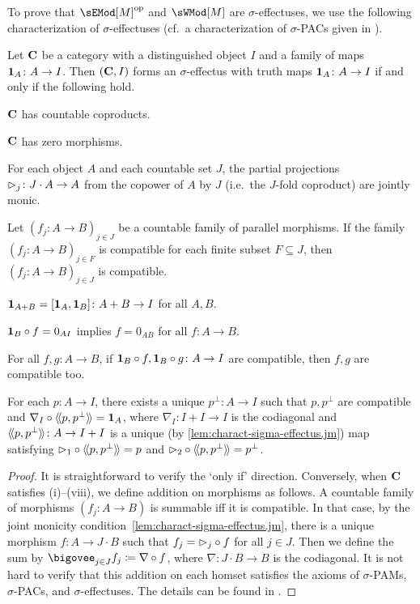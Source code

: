 \documentclass[%
	submission,
copyright,creativecommons,UKenglish]{eptcs}
\begin{document}
To prove that $\sEMod[M]^{\opp}$
and $\sWMod[M]$ are $\sigma$-effectuses,
we use the following characterization of $\sigma$-effectuses
(cf.\ a characterization of $\sigma$-PACs given in \cite[\S\,5]{ArbibM1980}).

\begin{lemma}
\label{lem:charact-sigma-effectus}
Let $\mathbf{C}$ be a category with
a distinguished object $I$ and
a family of maps $\mathbf{1}_A\colon A\to I$.
Then $(\mathbf{C},I)$
forms an $\sigma$-effectus with truth maps $\mathbf{1}_A\colon A\to I$
if and only if
the following hold.
\begin{myenum}
\item
$\mathbf{C}$ has countable coproducts.
\item
$\mathbf{C}$ has zero morphisms.
\item\label{lem:charact-sigma-effectus.jm}
For each object $A$
and each countable set $J$,
the partial projections
$\mathord{\vartriangleright}_j\colon J \cdot A\to A$
from the copower of $A$ by $J$
(i.e.\ the $J$-fold coproduct) are jointly monic.
\item\label{lem:charact-sigma-effectus.compat}
Let $(f_j\colon A\to B)_{j\in J}$
be a countable family of parallel morphisms.
If the family $(f_j\colon A\to B)_{j\in F}$
is compatible for each finite subset $F\subseteq J$,
then $(f_j\colon A\to B)_{j\in J}$ is compatible.
\item
$\mathbf{1}_{A+B}=[\mathbf{1}_A,\mathbf{1}_B]\colon A+B\to I$
for all $A,B$.
\item
$\mathbf{1}_B\circ f=0_{A I}$ implies $f=0_{A B}$
for all $f\colon A\to B$.
\item
For all $f,g\colon A\to B$,
if $\mathbf{1}_B\circ f, \mathbf{1}_B\circ g\colon A\to I$
are compatible,
then $f, g$ are compatible too.
\item
For each $p\colon A\to I$,
there exists a unique $p^{\bot}\colon A\to I$
such that $p,p^{\bot}$ are compatible and
$\nabla_I\circ\langle\!\langle p,p^{\bot}\rangle\!\rangle=\mathbf{1}_A$,
where $\nabla_I\colon I+I\to I$ is the codiagonal
and $\langle\!\langle p,p^{\bot}\rangle\!\rangle\colon A\to I+I$ is a unique
(by \textup{\ref{lem:charact-sigma-effectus.jm}})
map satisfying $\mathord{\vartriangleright}_1\circ \langle\!\langle p,p^{\bot}\rangle\!\rangle=p$
and $\mathord{\vartriangleright}_2\circ \langle\!\langle p,p^{\bot}\rangle\!\rangle=p^{\bot}$.
\end{myenum}
\end{lemma}
\begin{proof}
It is straightforward to verify the `only if' direction.
Conversely, when $\mathbf{C}$ satisfies (i)--(viii), we define
addition on morphisms as follows.
A countable family of morphisms
$(f_j\colon A\to B)$ is summable iff it is compatible.
In that case, by the joint monicity
condition~\ref{lem:charact-sigma-effectus.jm},
there is a unique morphism $f\colon A\to J\cdot B$
such that $f_j=\mathord{\vartriangleright}_j\circ f$ for all $j\in J$.
Then we define the sum by $\bigovee_{j\in J} f_j\coloneqq\nabla\circ f$,
where $\nabla\colon J\cdot B\to B$ is the codiagonal.
It is not hard to verify
that this addition on each homset satisfies the axioms of $\sigma$-PAMs,
$\sigma$-PACs, and $\sigma$-effectuses.
The details can be found in
\cite[Proposition~3.8.6 and Lemma~7.3.38]{Cho2019PhD}.
\end{proof}
\end{document}
